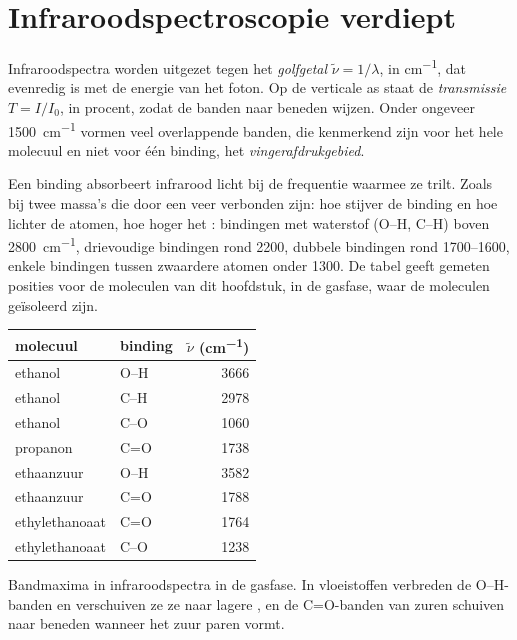 \section{Infraroodspectroscopie verdiept}

\begin{definition}\label{def:b1:structure-spectroscopy:wavenumber}
Infraroodspectra worden uitgezet tegen het
\emph{golfgetal} $\tilde\nu = 1/\lambda$, in
\unit{cm^{-1}}, dat evenredig is met de energie van het foton. Op de
verticale as staat de \emph{transmissie}
$T = I/I_0$, in procent, zodat de banden naar beneden wijzen. Onder
ongeveer \qty{1500}{cm^{-1}} vormen veel overlappende banden, die
kenmerkend zijn voor het hele molecuul en niet voor één binding, het
\emph{vingerafdrukgebied}.
\end{definition}

Een binding absorbeert infrarood licht bij de frequentie waarmee ze
trilt. Zoals bij twee massa's die door een veer verbonden zijn: hoe
stijver de binding en hoe lichter de atomen, hoe hoger het :
bindingen met waterstof (O--H, C--H) boven \qty{2800}{cm^{-1}},
drievoudige bindingen rond 2200, dubbele bindingen rond 1700--1600,
enkele bindingen tussen zwaardere atomen onder 1300. De tabel geeft
gemeten posities voor de moleculen van dit hoofdstuk, in de gasfase,
waar de moleculen geïsoleerd zijn.

\begin{omfigure}
\begin{tabular}{llr}
\hline
molecuul & binding & $\tilde\nu$ (\unit{cm^{-1}}) \\
\hline
ethanol & O--H & 3666 \\
ethanol & C--H & 2978 \\
ethanol & C--O & 1060 \\
propanon & C=O & 1738 \\
ethaanzuur & O--H & 3582 \\
ethaanzuur & C=O & 1788 \\
ethylethanoaat & C=O & 1764 \\
ethylethanoaat & C--O & 1238 \\
\hline
\end{tabular}

\smallskip
{\small Bandmaxima in infraroodspectra in de gasfase. In vloeistoffen
verbreden  de O--H-banden en verschuiven ze ze naar
lagere , en de C=O-banden van zuren schuiven naar beneden
wanneer het zuur paren vormt.}
\end{omfigure}

